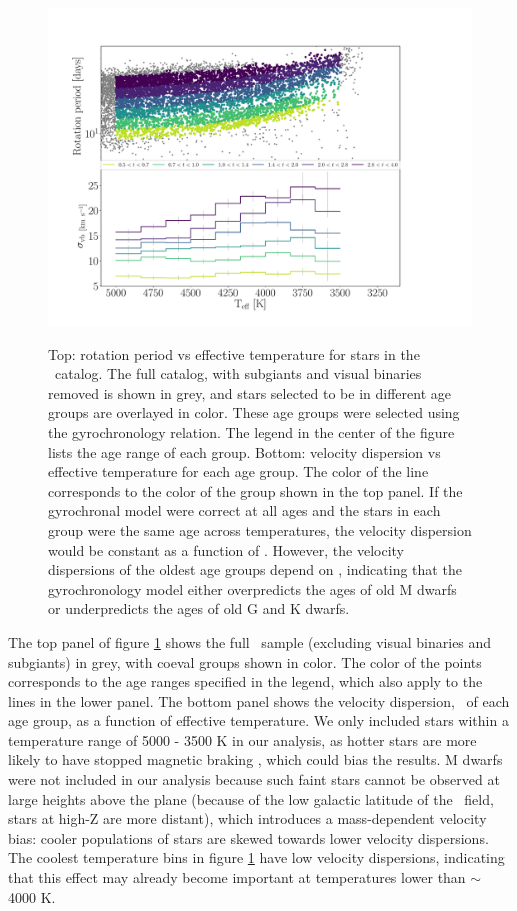 \begin{figure}
  \caption{
Top: rotation period vs effective temperature for stars in the \mct\
    catalog.
    The full catalog, with subgiants and visual binaries removed is shown in
    grey, and stars selected to be in different age groups are overlayed in
    color.
    These age groups were selected using the \citet{angus2019} gyrochronology
    relation.
The legend in the center of the figure lists the age range of each group.
    Bottom: velocity dispersion vs effective temperature for each age group.
The color of the line corresponds to the color of the group shown in the top
    panel.
If the gyrochronal model were correct at all ages and the stars in each group
    were the same age across temperatures, the velocity dispersion would be
    constant as a function of \teff.
However, the velocity dispersions of the oldest age groups depend on \teff,
    indicating that the \citet{angus2019} gyrochronology model either
    overpredicts the ages of old M dwarfs or underpredicts the ages of old G
    and K dwarfs.
}
  \centering
    \includegraphics[width=1\textwidth]{age_cut}
\label{fig:age_cut}
\end{figure}
The top panel of figure \ref{fig:age_cut} shows the full \mct\ sample
(excluding visual binaries and subgiants) in grey, with coeval groups shown in
color.
The color of the points corresponds to the age ranges specified in the legend,
which also apply to the lines in the lower panel.
The bottom panel shows the velocity dispersion, \sigmavb\ of each age group,
as a function of effective temperature.
We only included stars within a temperature range of 5000 - 3500 K in our
analysis, as hotter stars are more likely to have stopped magnetic braking
\citep{vansaders2016}, which could bias the results.
M dwarfs were not included in our analysis because such faint stars cannot be
observed at large heights above the plane (because of the low galactic
latitude of the \kepler\ field, stars at high-Z are more distant), which
introduces a mass-dependent velocity bias: cooler populations of stars are
skewed towards lower velocity dispersions.
The coolest temperature bins in figure \ref{fig:age_cut} have low velocity
dispersions, indicating that this effect may already become important at
temperatures lower than $\sim$ 4000 K.

